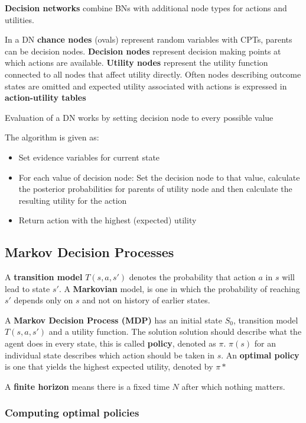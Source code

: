 \documentclass{article}
\begin{document}
\textbf{Decision networks} combine BNs with additional node types for actions and utilities. 

In a DN \textbf{chance nodes} (ovals) represent random variables with CPTs, parents can be decision nodes. \textbf{Decision nodes} represent decision making points at which actions are available. \textbf{Utility nodes} represent the utility function connected to all nodes that affect utility directly. Often nodes describing outcome states are omitted and expected utility associated with actions is expressed in \textbf{action-utility tables}

Evaluation of a DN works by setting decision node to every possible value

The algorithm is given as:
\begin{itemize}
    \item Set evidence variables for current state
    \item For each value of decision node: Set the decision node to that value, calculate the posterior probabilities for parents of utility node and then calculate the resulting utility for the action
    \item Return action with the highest (expected) utility
\end{itemize}

\subsection{Markov Decision Processes}

A \textbf{transition model} $T(s,a,s')$ denotes the probability that action $a$ in $s$ will lead to state $s'$. A \textbf{Markovian} model, is one in which the probability of reaching $s'$ depends only on $s$ and not on history of earlier states. \newline

A \textbf{Markov Decision Process (MDP)} has an initial state $S_0$, transition model $T(s,a,s')$ and a utility function. The solution solution should describe what the agent does in every state, this is called \textbf{policy}, denoted as $\pi$. $\pi(s)$ for an individual state describes which action should be taken in $s$. An \textbf{optimal policy} is one that yields the highest expected utility, denoted by $\pi*$ \newline

A \textbf{finite horizon} means there is a fixed time $N$ after which nothing matters. 

\subsubsection{Computing optimal policies}
\end{document}
